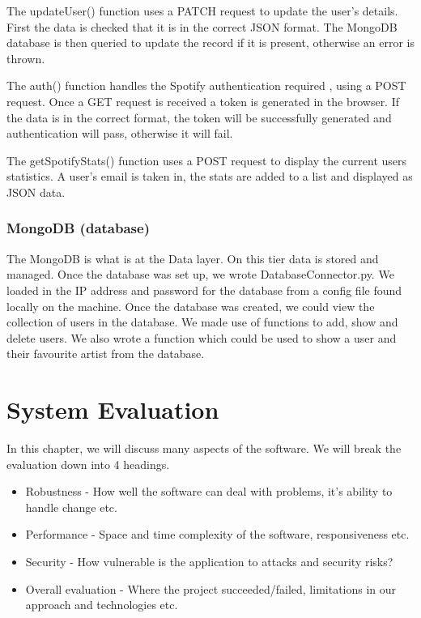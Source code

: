 The updateUser() function uses a PATCH request to update the user’s details. First the data is checked that it is in the correct JSON format. The MongoDB database is then queried to update the record if it is present, otherwise an error is thrown.

The auth() function handles the Spotify authentication required , using a POST request. Once a GET request is received a token is generated in the browser. If the data is in the correct format, the token will be successfully generated and authentication will pass, otherwise it will fail.

The getSpotifyStats() function uses a POST request to display the current users statistics. A user’s email is taken in, the stats are added to a list and displayed as JSON data.


\subsection{MongoDB (database)}
The MongoDB is what is at the Data layer. On this tier data is stored and managed. Once the database was set up, we wrote DatabaseConnector.py. We loaded in the IP address and password for the database from a config file found locally on the machine. Once the database was created, we could view the collection of users in the database. We made use of functions to add, show and delete users. We also wrote a function which could be used to show a user and their favourite artist from the database.

\chapter{System Evaluation}
In this chapter, we will discuss many aspects of the software. We will break the evaluation down into 4 headings.
\begin{itemize}
  \item Robustness - How well the software can deal with problems, it's ability to handle change etc.
  \item Performance - Space and time complexity of the software, responsiveness etc.
  \item Security - How vulnerable is the application to attacks and security risks?
  \item Overall evaluation - Where the project succeeded/failed, limitations in our approach and technologies etc.
  \end{itemize}

